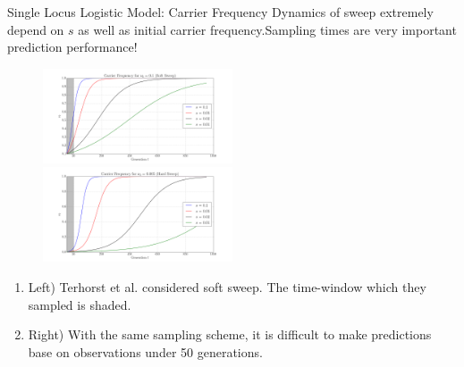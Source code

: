 \documentclass[t]{beamer} %
\begin{document}
\begin{frame}{Single Locus Logistic Model: Carrier Frequency}
Dynamics of sweep extremely depend on $s$ as well as initial carrier frequency.Sampling times are very important prediction performance!

\begin{figure}
\centering
\hspace{-0in}\includegraphics[trim={2in 0.5in 1.5in 0in},clip,page=2,width=0.5\textwidth]{sigmoidSoft}
\hspace{-0in}\includegraphics[trim={2in 0.5in 1.9in 0in},clip,page=2,width=0.5\textwidth]{sigmoidHard}
\end{figure}
{\tiny
\begin{enumerate}
\item Left) Terhorst et al. considered soft sweep. The time-window which  they sampled is shaded. 
\item Right) With the same sampling scheme, it is difficult to make predictions base on observations under 50 generations.
\end{enumerate}
}
\end{frame}
\end{document}
